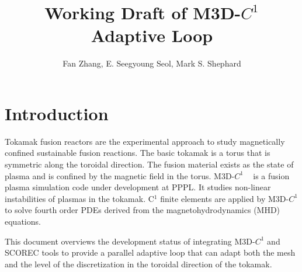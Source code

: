 \documentclass[11pt]{article}  %
\title{Working Draft of M3D-$C^1$ Adaptive Loop}
\author{Fan Zhang, E. Seegyoung Seol, Mark S. Shephard}
\begin{document}
 
\maketitle
\tableofcontents

\section{Introduction} \label{sec:intro}

Tokamak fusion reactors \cite{wesson2011tokamaks} are the experimental approach to study magnetically confined sustainable fusion reactions. The basic tokamak is a torus that is symmetric along the toroidal direction. The fusion material exists as the state of plasma and is confined by the magnetic field \cite{chen1984introduction} in the torus. M3D-$C^1$ ~\cite{jardin2004triangular,jardin2007high,ferraro2009calculations,jardin2012review,jardin2012multiple, Ferraro2011, Ferraro2014} is a fusion plasma simulation code under development at PPPL.  It studies non-linear instabilities of plasmas in the tokamak.  C$^1$ finite elements are applied by M3D-$C^1$ to solve fourth order PDEs derived from the magnetohydrodynamics (MHD) equations. 

This document overviews the development status of integrating M3D-$C^1$ and SCOREC tools to provide a parallel adaptive loop that can adapt both the mesh and the level of the discretization in the toroidal direction of the tokamak.
\end{document}
